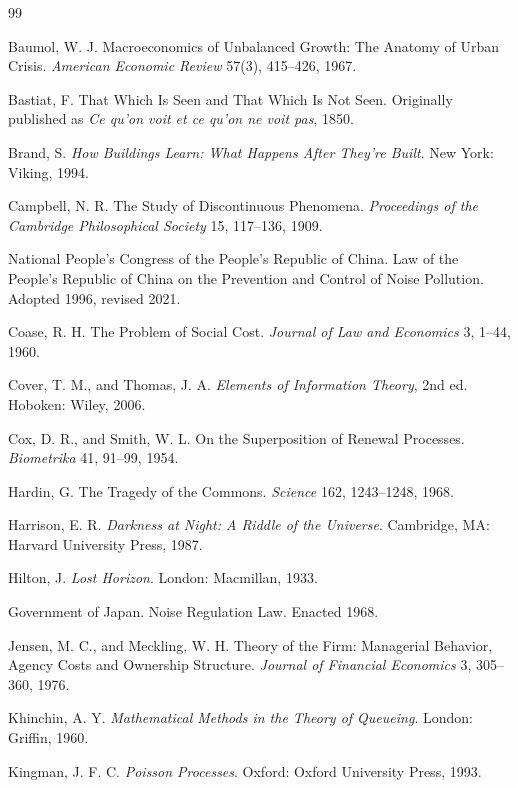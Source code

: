 \documentclass[11pt]{article}
\theoremstyle{definition}
\theoremstyle{remark}
\begin{document}
\begin{thebibliography}{99}

Baumol, W. J. Macroeconomics of Unbalanced Growth: The Anatomy of Urban Crisis. \emph{American Economic Review} 57(3), 415--426, 1967.

Bastiat, F. That Which Is Seen and That Which Is Not Seen. Originally published as \emph{Ce qu'on voit et ce qu'on ne voit pas}, 1850.

Brand, S. \emph{How Buildings Learn: What Happens After They're Built}. New York: Viking, 1994.

Campbell, N. R. The Study of Discontinuous Phenomena. \emph{Proceedings of the Cambridge Philosophical Society} 15, 117--136, 1909.

National People's Congress of the People's Republic of China. Law of the People's Republic of China on the Prevention and Control of Noise Pollution. Adopted 1996, revised 2021.

Coase, R. H. The Problem of Social Cost. \emph{Journal of Law and Economics} 3, 1--44, 1960.

Cover, T. M., and Thomas, J. A. \emph{Elements of Information Theory}, 2nd ed. Hoboken: Wiley, 2006.

Cox, D. R., and Smith, W. L. On the Superposition of Renewal Processes. \emph{Biometrika} 41, 91--99, 1954.

Hardin, G. The Tragedy of the Commons. \emph{Science} 162, 1243--1248, 1968.

Harrison, E. R. \emph{Darkness at Night: A Riddle of the Universe}. Cambridge, MA: Harvard University Press, 1987.

Hilton, J. \emph{Lost Horizon}. London: Macmillan, 1933.

Government of Japan. Noise Regulation Law. Enacted 1968.

Jensen, M. C., and Meckling, W. H. Theory of the Firm: Managerial Behavior, Agency Costs and Ownership Structure. \emph{Journal of Financial Economics} 3, 305--360, 1976.

Khinchin, A. Y. \emph{Mathematical Methods in the Theory of Queueing}. London: Griffin, 1960.

Kingman, J. F. C. \emph{Poisson Processes}. Oxford: Oxford University Press, 1993.


\end{thebibliography}
\end{document}
